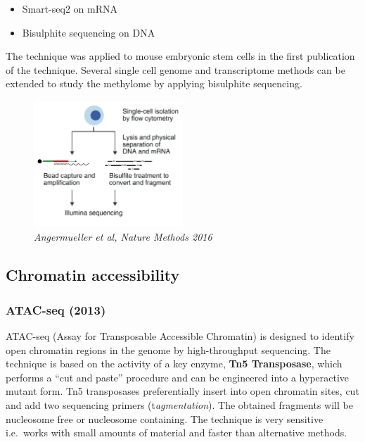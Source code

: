\begin{itemize}
\tightlist
\item
  Smart-seq2 on mRNA
\item
  Bisulphite sequencing on DNA
\end{itemize}

The technique was applied to mouse embryonic stem cells in the first
publication of the technique. Several single cell genome and
transcriptome methods can be extended to study the methylome by applying
bisulphite sequencing.

\begin{figure}
\centering
\includegraphics[width=0.5\textwidth]{images/Screenshot_6.png}
\caption{\emph{Angermueller et al, Nature Methods 2016}}
\end{figure}

\hypertarget{chromatin-accessibility}{%
\subsection{Chromatin accessibility}\label{chromatin-accessibility}}

\hypertarget{atac-seq-2013}{%
\subsubsection{ATAC-seq (2013)}\label{atac-seq-2013}}

ATAC-seq (Assay for Transposable Accessible Chromatin) is designed to
identify open chromatin regions in the genome by high-throughput
sequencing. The technique is based on the activity of a key enzyme,
\textbf{Tn5 Transposase}, which performs a ``cut and paste'' procedure
and can be engineered into a hyperactive mutant form. Tn5 transposases
preferentially insert into open chromatin sites, cut and add two
sequencing primers (t\emph{agmentation}). The obtained fragments will be
nucleosome free or nucleosome containing. The technique is very
sensitive i.e.~works with small amounts of material and faster than
alternative methods.

